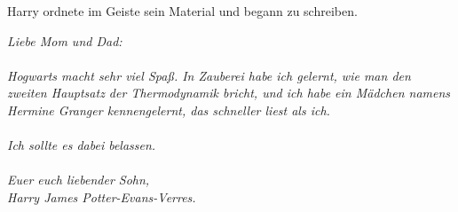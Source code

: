 Harry ordnete im Geiste sein Material und begann zu schreiben.

\emph{Liebe Mom und Dad:\\~\\
Hogwarts macht sehr viel Spaß. In Zauberei habe ich gelernt, wie man den zweiten
Hauptsatz der Thermodynamik bricht, und ich habe ein Mädchen namens Hermine
Granger kennengelernt, das schneller liest als ich.\\~\\
Ich sollte es dabei belassen.\\~\\
Euer euch liebender Sohn,\\
Harry James Potter-Evans-Verres.}
